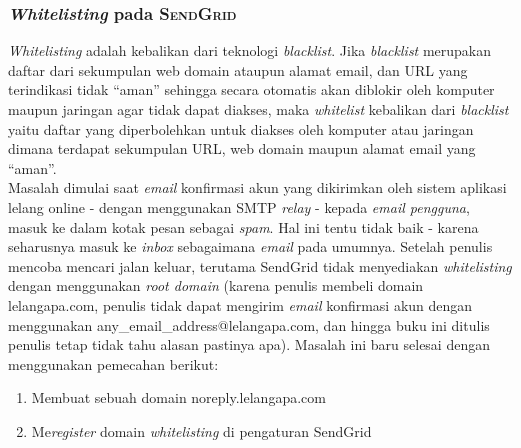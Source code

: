 \subsubsection{\textit{Whitelisting} pada \textsc{SendGrid}}
	\textit{Whitelisting} adalah kebalikan dari teknologi \textit{blacklist}. Jika \textit{blacklist} merupakan daftar dari sekumpulan web domain ataupun alamat email, dan URL yang terindikasi tidak “aman” sehingga secara otomatis akan diblokir oleh komputer maupun jaringan agar tidak dapat diakses, maka \textit{whitelist} kebalikan dari \textit{blacklist} yaitu daftar yang diperbolehkan untuk diakses oleh komputer atau jaringan dimana terdapat sekumpulan URL, web domain maupun alamat email yang “aman”.\\
	\indent Masalah dimulai saat \textit{email} konfirmasi akun yang dikirimkan oleh sistem aplikasi lelang online - dengan menggunakan SMTP \textit{relay} - kepada \textit{email pengguna}, masuk ke dalam kotak pesan sebagai \textit{spam}. Hal ini tentu tidak baik - karena seharusnya masuk ke \textit{inbox} sebagaimana \textit{email} pada umumnya. Setelah penulis mencoba mencari jalan keluar, terutama SendGrid tidak menyediakan \textit{whitelisting} dengan menggunakan \textit{root domain} (karena penulis membeli domain lelangapa.com, penulis tidak dapat mengirim \textit{email} konfirmasi akun dengan menggunakan any\_email\_address@lelangapa.com, dan hingga buku ini ditulis penulis tetap tidak tahu alasan pastinya apa). Masalah ini baru selesai dengan menggunakan pemecahan berikut:
	\begin{enumerate}
		\item Membuat sebuah domain noreply.lelangapa.com
		\item Me\textit{register} domain \textit{whitelisting} di pengaturan SendGrid
	\end{enumerate}
	
